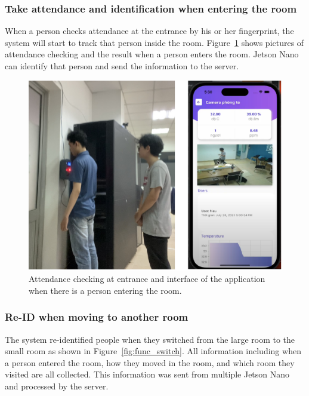 \documentclass[../main.tex]{subfiles}
\begin{document}
\subsubsection{Take attendance and identification when entering the room}
When a person checks attendance at the entrance by his or her fingerprint, the system will start to track that person inside the room. Figure~\ref{fig:func_enter} shows pictures of attendance checking and the result when a person enters the room. Jetson Nano can identify that person and send the information to the server.

\begin{figure}[h!]
\centering
\includegraphics[width=\linewidth]{Figure/func_enter.pdf}
\caption{Attendance checking at entrance and interface of the application when there is a person entering the room.}
\label{fig:func_enter}
\end{figure}

\subsubsection{Re-ID when moving to another room}
The system re-identified people when they switched from the large room to the small room as shown in Figure~\ref{fig:func_switch}. All information including when a person entered the room, how they moved in the room, and which room they visited are all collected. This information was sent from multiple Jetson Nano and processed by the server.
\end{document}
